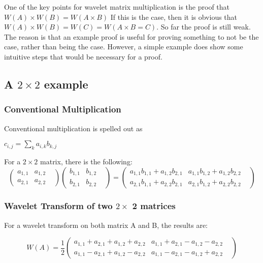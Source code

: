 One of the key points for wavelet matrix multiplication is the proof that $W(A) \times W(B) = W(A\times B)$  If this is the case, then it is obvious that $W(A) \times W(B) = W(C) = W(A\times B = C)$.  So far the proof is still weak.  The reason is that an example proof is useful for proving something to not be the case, rather than being the case.   However, a simple example does show some intuitive steps that would be necessary for a proof.  

\subsection{A $2\times 2$ example}
\subsubsection{Conventional Multiplication}

Conventional multiplication is spelled out as

$c_{i,j} = \sum\limits_k a_{i,k} b_{k,j}$

For a $2 \times 2$ matrix, there is the following:
\[
\left(
\begin{array}{ccc}
  a_{1,1}&  a_{1,2} &   \\
 a_{2,1} &  a_{2,2} &   
\end{array}
\right)
\left(
\begin{array}{ccc}
  b_{1,1}&  b_{1,2} &   \\
 b_{2,1} &  b_{2,2} &   
\end{array}
\right) =
\left(
\begin{array}{ccc}
  a_{1,1} b_{1,1} + a_{1,2} b_{2,1}&  a_{1,1}b_{1,2} + a_{1,2}  b_{2,2} &   \\
 a_{2,1} b_{1,1} + a_{2,2} b_{2,1} &  a_{2,1} b_{1,2} + a_{2,2} b_{2,2} &   
\end{array}
\right)
\]

\subsubsection{Wavelet Transform of two $2\times$ 2 matrices}

For a wavelet transform on both matrix A and B, the results are:

\[
W(A) = \frac{1}{2} \left(
\begin{array}{ccc}
  a_{1,1} + a_{2,1} + a_{1,2} + a_{2,2} &  a_{1,1} + a_{2,1} - a_{1,2} - a_{2,2} &   \\
 a_{1,1} - a_{2,1} + a_{1,2} - a_{2,2} &  a_{1,1} - a_{2,1} - a_{1,2} + a_{2,2} &   
\end{array}
\right)
\]

